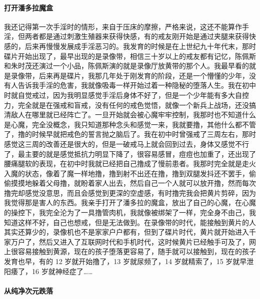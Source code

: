 \paragraph{打开潘多拉魔盒}

我还记得第一次手淫时的情形，来自于压床的摩擦，严格来说，这还不能算作手淫，但两者都是通过刺激生殖器来获得快感，有的戒友刚开始是通过夹腿来获得快感的，后来再慢慢发展成手淫恶习的。我发育的时候是在上世纪九十年代末，那时碟片开始出现了，最早出现的是录像带，相信三十岁以上的戒友都有记忆，陈佩斯和朱时茂还演过一个小品，陈佩斯演的就是录像厅放黄带的那个人。我最早看的就是录像带，后来再是碟片，我那几年处于刚发育的阶段，还是一个懵懂的少年，没有人告诉我手淫的危害，我就像吸毒一样开始过着一种隐秘的堕落人生。我在初中时就自觉戒过，因为我明显感觉手淫后身体不好了，但是一个少年能有多大自控力，完全就是在强戒和盲戒，没有任何的戒色觉悟，就像一个新兵上战场，还没搞清敌人在哪里就已经阵亡了。一旦开始就会被心魔牢牢控制，我那时也不知道什么是心魔，完全没概念，我只知道那种念头和感觉一来，我就要撸，其他什么都不管了，撸的时候早就把戒色的誓言抛之脑后了。我在初中时曾强戒了三周左右，那时感觉这三周的改善还是很大的，但是一破戒马上就会回到过去，身体又感觉不行了，最主要的就是感觉抵抗力明显下降了，很容易感冒，痘痘也加重了，还出现了腰痛腿软的表现，在初中时我就已经把自己撸成了慢前患者。我那时完全就是走火入魔的状态，像着了魔一样地撸，撸到射不出还在撸，撸到双腿发抖还不罢手，偷偷摸摸地躲着父母撸，就盼着家人出去，然后自己一个人就可以放开撸，然而每次撸完却感觉没意思，而且会感觉到更深的空虚感，有时撸完我会把黄片剪碎，因为我觉得那是害人的东西。我亲手打开了潘多拉的魔盒，放出了自己的心魔，在心魔的操控下，我完全沦为了一具撸管肉机，我就像被绑架了一样，完全身不由己，我知道这样不好，自己也想戒，但是无法做到。在录像带的时代，能接触到黄片的人其实还算少的，录像机也不是家家户户都有，但到了碟片时代，黄片就开始进入千家万户了，然后又进入了互联网时代和手机时代，这时候黄片已经触手可及了，网上很容易接触到黄源，现在的孩子堕落更容易了，随手就可以接触到，现在的孩子发育也早，有的 12 岁就开始撸了，13 岁就尿频了，14 岁就精索了，15 岁就早泄阳痿了，16 岁就神经症了……

\paragraph{从纯净次元跌落}

